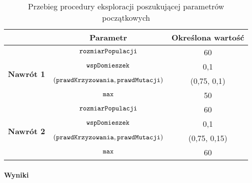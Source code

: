 \documentclass[./FM_mgr.tex]{subfiles}
\begin{document}
\begin{table}[H]
	\caption{Przebieg procedury eksploracji poszukującej parametrów początkowych \label{table:knapsack_tweak_flow}}
	\centering
	\begin{tabular}{c|c|c|}
		\cline{2-3}
		& {\bf Parametr}                                     & {\bf Określona wartość} \\ \hline
		\multicolumn{1}{|c|}{\multirow{4}{*}{{\bf Nawrót 1}}} & $\mathtt{rozmiarPopulacji}$                         & 60                      \\ \cline{2-3} 
		\multicolumn{1}{|c|}{}                                & $\mathtt{wspDomieszek}$                             & 0,1                     \\ \cline{2-3} 
		\multicolumn{1}{|c|}{}                                & $(\mathtt{prawdKrzyzowania}, \mathtt{prawdMutacji})$ & (0,75, 0,1)             \\ \cline{2-3} 
		\multicolumn{1}{|c|}{}                                & $\mathtt{max}$                                      & 50                     \\ \hline \hline
		\multicolumn{1}{|c|}{\multirow{4}{*}{{\bf Nawrót 2}}} & $\mathtt{rozmiarPopulacji}$                         & 60                      \\ \cline{2-3} 
		\multicolumn{1}{|c|}{}                                & $\mathtt{wspDomieszek}$                             & 0,1                     \\ \cline{2-3} 
		\multicolumn{1}{|c|}{}                                & $(\mathtt{prawdKrzyzowania}, \mathtt{prawdMutacji})$ & (0,75, 0,15)             \\ \cline{2-3} 
		\multicolumn{1}{|c|}{}                                & $\mathtt{max}$                                      & 60                     \\ \hline
	\end{tabular}
\end{table}	

\paragraph{Wyniki}
\end{document}
